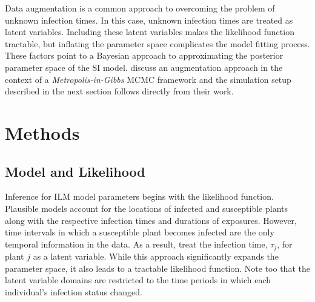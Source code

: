\documentclass{uwstat572}
\begin{document}
Data augmentation is a common approach to overcoming the problem of unknown infection times. 
In this case, unknown infection times are treated as latent variables. 
Including these latent variables makes the likelihood function tractable, but inflating the parameter space complicates the model fitting process. 
These factors point to a Bayesian approach to approximating the posterior parameter space of the SI model. 
\citet{Jewell} discuss an augmentation approach in the context of a \textit{Metropolis-in-Gibbs} MCMC framework and the simulation setup described in the next section follows directly from their work. 

\section{Methods}
\subsection{Model and Likelihood}

Inference for ILM model parameters begins with the likelihood function. 
Plausible models account for the locations of infected and susceptible plants along with the respective infection times and durations of exposures. 
However, time intervals in which a susceptible plant becomes infected are the only temporal information in the data. 
As a result, treat the infection time, $\tau_j$, for plant $j$ as a latent variable. 
While this approach significantly expands the parameter space, it also leads to a tractable likelihood function. 
Note too that the latent variable domains are restricted to the time periods in which each individual's infection status changed. 
\end{document}
